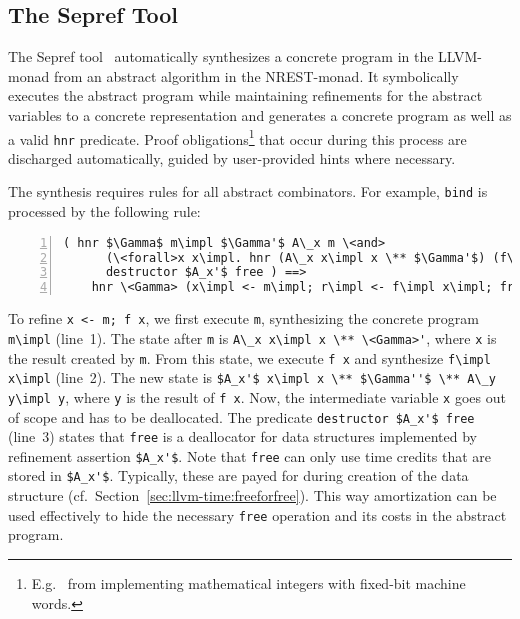 \documentclass[acmsmall]{acmart}
\newcommand{\is}{\lstinline[language=isabelle]}
\newcommand{\cf}{cf.\xspace}
\begin{document}

\subsection{The Sepref Tool}\label{sec:sepreftool}


The Sepref tool~\cite{Lammich15,lammich2019LLVM} automatically synthesizes a concrete program in the LLVM-monad from an abstract algorithm in the NREST-monad. 
It symbolically executes the abstract program while maintaining refinements for the abstract variables to a concrete representation and generates a concrete program as well as a valid \is{hnr} predicate.
Proof obligations\footnote{E.g.\ %
from implementing mathematical integers with fixed-bit machine words.} that occur during this process are discharged automatically, guided by user-provided hints where necessary.

The synthesis requires rules for all abstract combinators. 
For example, \is{bind} is processed by the following rule:
\begin{lstlisting}[numbers=left,xleftmargin=4.0ex]
    ( hnr $\Gamma$ m\impl $\Gamma'$ A\_x m \<and>
      (\<forall>x x\impl. hnr (A\_x x\impl x \** $\Gamma'$) (f\impl x\impl) ($A_x'$ x\impl x \** $\Gamma''$) A\_y (f x)) \<and>
      destructor $A_x'$ free ) ==> 
    hnr \<Gamma> (x\impl <- m\impl; r\impl <- f\impl x\impl; free x\impl; return r\impl) $\Gamma''$ A\_y (x <- m; f x)
\end{lstlisting}
To refine \is{x <- m; f x}, we first execute \is{m}, synthesizing the concrete program \is{m\impl} (line~1).
The state after \is{m} is \is{A\_x x\impl x \** \<Gamma>'}, where \is{x} is the result created by \is{m}.
From this state, we execute \is{f x} and synthesize \is{f\impl x\impl} (line~2). 
The new state is \is{$A_x'$ x\impl x \** $\Gamma''$ \** A\_y y\impl y}, where \is{y} is the result of \is{f x}.
Now, the intermediate variable \is{x} goes out of scope and has to be deallocated.
The predicate \is{destructor $A_x'$ free} (line~3) states that \is{free} is a deallocator for data structures implemented by refinement assertion \is{$A_x'$}.
Note that \is{free} can only use time credits that are stored in \is{$A_x'$}.
Typically, these are payed for during creation of the data structure (\cf\ Section~\ref{sec:llvm-time:freeforfree}).
This way amortization can be used effectively to hide the necessary \is{free} operation and its costs in the abstract program.
\end{document}
